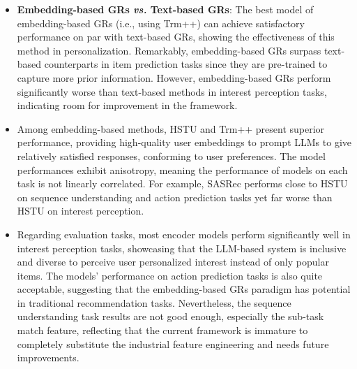 \begin{itemize}[leftmargin=*]

\item \textbf{Embedding-based GRs \textit{vs.} Text-based GRs}: 
The best model of embedding-based GRs (i.e., using Trm++) can achieve satisfactory performance on par with text-based GRs, showing the effectiveness of this method in personalization. Remarkably, embedding-based GRs surpass text-based counterparts in item prediction tasks since they are pre-trained to capture more prior information. However, embedding-based GRs perform significantly worse than text-based methods in interest perception tasks, indicating room for improvement in the framework.

\item Among embedding-based methods, HSTU and Trm++ present superior performance, providing high-quality user embeddings to prompt LLMs to give relatively satisfied responses, conforming to user preferences.  
The model performances exhibit anisotropy, meaning the performance of models on each task is not linearly correlated. For example, SASRec performs close to HSTU on sequence understanding and action prediction tasks yet far worse than HSTU on interest perception.


\item Regarding evaluation tasks, most encoder models perform significantly well in interest perception tasks, showcasing that the LLM-based system is inclusive and diverse to perceive user personalized interest instead of only popular items. The models' performance on action prediction tasks is also quite acceptable, suggesting that the embedding-based GRs paradigm has potential in traditional recommendation tasks. Nevertheless, the sequence understanding task results are not good enough, especially the sub-task match feature, reflecting that the current framework is immature to completely substitute the industrial feature engineering and needs future improvements.


\end{itemize}
